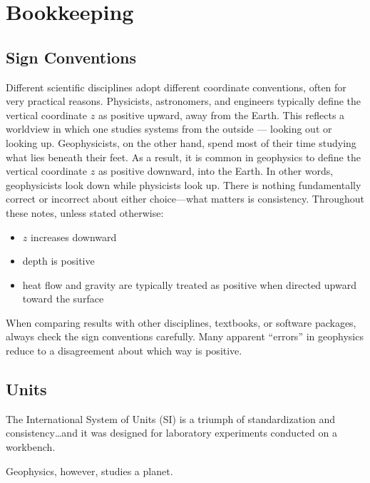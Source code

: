 \section*{Bookkeeping}

\subsection*{Sign Conventions}
Different scientific disciplines adopt different coordinate conventions, often for very practical reasons.  Physicists, astronomers, and engineers typically define the vertical coordinate $z$ as positive upward, away from the Earth. This reflects a worldview in which one studies systems from the outside — looking out or looking up.  Geophysicists, on the other hand, spend most of their time studying what lies beneath their feet. As a result, it is common in geophysics to define the vertical coordinate $z$ as positive downward, into the Earth. In other words, geophysicists look down while physicists look up.  There is nothing fundamentally correct or incorrect about either choice---what matters is consistency. Throughout these notes, unless stated otherwise:
\begin{itemize}
    \item $z$ increases downward
    \item depth is positive
    \item heat flow and gravity are typically treated as positive when directed upward toward the surface
\end{itemize}

When comparing results with other disciplines, textbooks, or software packages, always check the sign conventions carefully. Many apparent “errors” in geophysics reduce to a disagreement about which way is positive.

\subsection*{Units}
The International System of Units (SI) is a triumph of standardization and consistency\ldots and it was designed for laboratory experiments conducted on a workbench.

Geophysics, however, studies a planet.

